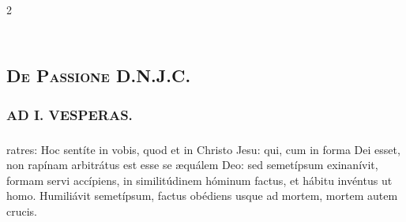 \documentclass[9pt,twoside]{extarticle}
\begin{document}
\begin{multicols}{2}
\subsection*{\center \textsc{\\ De Passione D.N.J.C.}}
\subsubsection*{\center {}}

\subsubsection*{\center \textsc{AD I. VESPERAS.}}
\subsubsection*{}
ratres: Hoc sentíte in vobis, quod et in Christo Jesu: qui, cum in forma Dei esset, non rapínam arbitrátus est esse se æquálem Deo: sed semetípsum exinanívit, formam servi accípiens, in similitúdinem hóminum factus, et hábitu invéntus ut homo. Humiliávit semetípsum, factus obédiens usque ad mortem, mortem autem crucis.


\end{multicols}
\end{document}
